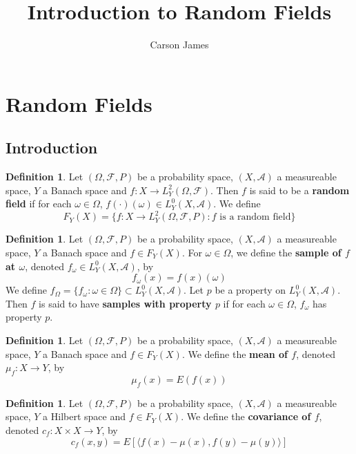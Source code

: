 \documentclass[12pt]{amsart}
\theoremstyle{definition}
\newtheorem{defn}[definition]{Definition}
\newcommand{\om}{\omega}
\newcommand{\Om}{\Omega}
\newcommand{\MA}{\mathcal{A}}
\newcommand{\MF}{\mathcal{F}}
\renewcommand{\r}{\rangle}
\renewcommand{\l}{\langle}
\begin{document}
	
	\title{Introduction to Random Fields}
	\author{Carson James}
	\maketitle
	
	\tableofcontents
	
	\section{Random Fields}

	\subsection{Introduction}
	
	\begin{defn}
	Let $(\Om, \MF, P)$ be a probability space, $(X, \MA)$ a measureable space, $Y$ a Banach space and $f: X \rightarrow L^2_Y(\Om, \MF)$. Then $f$ is said to be a \textbf{random field} if for each $\om \in \Om$, $ f(\cdot)(\om) \in L_Y^0(X, \MA)$.
	We define $$F_Y(X) = \{f:X \rightarrow L^2_Y(\Om, \MF, P): \text{$f$ is a random field}\}$$  
	\end{defn}
	
	\begin{defn}
	Let $(\Om, \MF, P)$ be a probability space, $(X, \MA)$ a measureable space, $Y$ a Banach space and $f \in F_Y(X)$. For $\om \in \Om$, we define the \textbf{ sample of $f$ at $\om$}, denoted $f_{\om} \in L^0_Y(X, \MA)$, by $$f_{\om}(x) = f(x)(\om)$$
	We define $f_{\Om} = \{f_{\om}: \om \in \Om \}\subset L^0_Y(X, \MA)$. Let $p$ be a property on $L^0_Y(X, \MA)$. Then $f$ is said to have \textbf{samples with property $p$} if for each $\om \in \Om$, $f_{\om}$ has property $p$.
	\end{defn}
	
	\begin{defn}
	Let $(\Om, \MF, P)$ be a probability space, $(X, \MA)$ a measureable space, $Y$ a Banach space and $f \in F_Y(X)$. We define the \textbf{mean of $f$}, denoted $\mu_f:X \rightarrow Y$, by $$\mu_f(x) = E(f(x))$$
	\end{defn}	
	
	\begin{defn}
	Let $(\Om, \MF, P)$ be a probability space, $(X, \MA)$ a measureable space, $Y$ a Hilbert space and $f \in F_Y(X)$. We define the \textbf{covariance of $f$}, denoted $c_f:X \times X \rightarrow Y$, by $$c_f(x, y) = E[\l f(x) - \mu(x), f(y) - \mu(y) \r]$$ 
	\end{defn}
	
\end{document}

